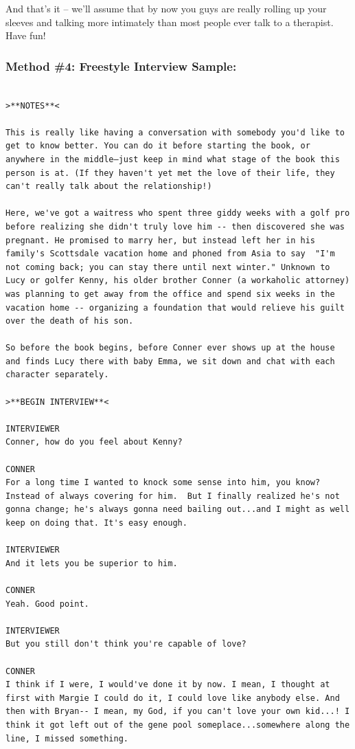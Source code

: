 \documentclass[openleft,oneside,showtrims]{memoir}
\begin{document}
And that's it -- we'll assume that by now you guys are really rolling up your sleeves and talking more intimately than most people ever talk to a therapist. Have fun! 

\subsubsection*{Method \#4: Freestyle Interview Sample:}
\label{sec:orgc867dc8}

\lstset{language=fountain,label= ,caption= ,captionpos=b,numbers=none}
\begin{lstlisting}

>**NOTES**<

This is really like having a conversation with somebody you'd like to get to know better. You can do it before starting the book, or anywhere in the middle—just keep in mind what stage of the book this person is at. (If they haven't yet met the love of their life, they can't really talk about the relationship!)

Here, we've got a waitress who spent three giddy weeks with a golf pro before realizing she didn't truly love him -- then discovered she was pregnant. He promised to marry her, but instead left her in his family's Scottsdale vacation home and phoned from Asia to say  "I'm not coming back; you can stay there until next winter." Unknown to Lucy or golfer Kenny, his older brother Conner (a workaholic attorney) was planning to get away from the office and spend six weeks in the vacation home -- organizing a foundation that would relieve his guilt over the death of his son.

So before the book begins, before Conner ever shows up at the house and finds Lucy there with baby Emma, we sit down and chat with each character separately.

>**BEGIN INTERVIEW**<

INTERVIEWER
Conner, how do you feel about Kenny?

CONNER
For a long time I wanted to knock some sense into him, you know?  Instead of always covering for him.  But I finally realized he's not gonna change; he's always gonna need bailing out...and I might as well keep on doing that. It's easy enough.

INTERVIEWER
And it lets you be superior to him.

CONNER
Yeah. Good point.

INTERVIEWER
But you still don't think you're capable of love?

CONNER
I think if I were, I would've done it by now. I mean, I thought at first with Margie I could do it, I could love like anybody else. And then with Bryan-- I mean, my God, if you can't love your own kid...! I think it got left out of the gene pool someplace...somewhere along the line, I missed something.


\end{lstlisting}
\end{document}
